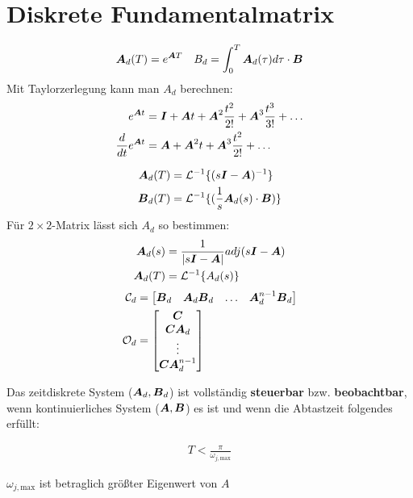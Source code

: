 	\section{Diskrete Fundamentalmatrix}
	\begin{tcolorbox}[colback=white!10!white,colframe=green!30!black,title=Definition] 
		\begin{align*}
			\boldsymbol{A}_d(T)= e^{\boldsymbol{A}T} && B_d = \int_{0}^{T}\boldsymbol{A}_d
		(\tau)d\tau	\cdot \boldsymbol{B} 
\end{align*}
Mit Taylorzerlegung kann man $A_d$ berechnen:
\begin{align*}
	e^{\boldsymbol{A}t}  &= \boldsymbol{I} + \boldsymbol{A}t+\boldsymbol{A}^2\frac{t^2}{2!} + \boldsymbol{A}^3\frac{t^3}{3!}+ \ldots\\
	\frac{d}{dt}e^{\boldsymbol{A}t} &= \boldsymbol{A} + \boldsymbol{A}^2t+\boldsymbol{A}^3\frac{t^2}{2!} + \ldots
\end{align*}
	\end{tcolorbox}	
		\begin{tcolorbox}[colback=white!10!white,colframe=blue!30!black,title=KOCHREZEPT: Fundamentalmatrix Berechnung] 
			\begin{align*}
			\boldsymbol{A}_d(T) &= \mathcal{L}^{-1}\{(s\boldsymbol{I}-\boldsymbol{A})^{-1}\}\\
			\boldsymbol{B}_d(T) &= \mathcal{L}^{-1}\{(\frac{1}{s}\boldsymbol{A}_d(s)\cdot \boldsymbol{B})\}
			\end{align*}
			Für $2\times2$-Matrix lässt sich $A_d$ so bestimmen:
			\begin{align*}
				\boldsymbol{A}_d(s) &= \frac{1}{|s\boldsymbol{I}-\boldsymbol{A}|} adj(s\boldsymbol{I}-\boldsymbol{A})\\
				\boldsymbol{A}_d(T) &= \mathcal{L}^{-1}\{A_d(s)\}
			\end{align*}
			\tcblower
			\begin{align*}
				\mathcal{C}_d &= \begin{bmatrix}
				\boldsymbol{B}_d & \boldsymbol{A}_d\boldsymbol{B}_d & \ldots & \boldsymbol{A}_d^{n-1}\boldsymbol{B}_d
				\end{bmatrix}\\
				\mathcal{O}_d &= \begin{bmatrix}
				\boldsymbol{C} \\\boldsymbol{C}\boldsymbol{A}_d \\ \vdots \\ \boldsymbol{C}\boldsymbol{A}_d^{n-1}
				\end{bmatrix}
			\end{align*}
			\begin{tcolorbox}[colback=white!10!white,colframe=gray!70!black,title=Steuerbarkeit und Beobachtbarkeit]
				Das zeitdiskrete System ($\boldsymbol{A}_d,\boldsymbol{B}_d$) ist vollständig \textbf{steuerbar} bzw. \textbf{beobachtbar}, wenn  kontinuierliches System ($\boldsymbol{A},\boldsymbol{B}$)  es ist und wenn die Abtastzeit folgendes erfüllt:
				 
				\begin{align*}
					T < \frac{\pi}{\omega_{j,\text{max}}}
				\end{align*}
				
				$\omega_{j,\text{max}}$ ist betraglich größter Eigenwert von $A$
			\end{tcolorbox}	
		\end{tcolorbox}
		\columnbreak
			